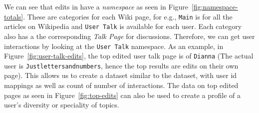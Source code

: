We can see that edits in \usercontrib have a \textit{namespace} as seen in Figure~\ref{fig:namespace-totals}. These are categories for each Wiki page, for e.g., \texttt{Main} is for all the articles on Wikipedia and \texttt{User Talk} is available for each user. Each category also has a the corresponding \textit{Talk Page} for discussions. Therefore, we can get user interactions by looking at the \texttt{User Talk} namespace. As an example, in Figure~\ref{fig:user-talk-edits}, the top edited user talk page is of \texttt{Dianna} (The actual user is \texttt{Justlettersandnumbers}, hence the top results are edits on their own page). This allows us to create a dataset similar to  the \wikitalk  dataset, with user id mappings as well as count of number of interactions. The data on top edited pages as seen in Figure~\ref{fig:top-edits} can also be used to create a profile of a user's diversity or speciality of topics.

